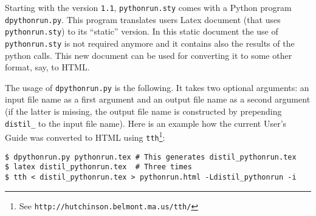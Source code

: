 \documentclass[a4paper,12pt]{article}
\begin{document}
Starting with the version \verb+1.1+, \verb+pythonrun.sty+ comes with
a Python program \verb+dpythonrun.py+. This program translates users
Latex document (that uses \verb+pythonrun.sty+) to its ``static''
version. In this static document the use of \verb+pythonrun.sty+ is not
required anymore and it contains also the results of the python calls. 
This new document can be used for converting it to some other
format, say, to HTML.

The usage of \verb+dpythonrun.py+ is the following. It takes two optional
arguments: an input file name as a first argument and an output file
name as a second argument (if the latter is missing, the output file name
is constructed by prepending \verb+distil_+ to the input file name).
Here is an example how the current User's Guide was converted to HTML
using \verb+tth+\footnote{See
  \texttt{http://hutchinson.belmont.ma.us/tth/}}:
\begin{verbatim}
$ dpythonrun.py pythonrun.tex # This generates distil_pythonrun.tex
$ latex distil_pythonrun.tex  # Three times
$ tth < distil_pythonrun.tex > pythonrun.html -Ldistil_pythonrun -i
\end{verbatim}

\pythonclean
\ifpythondistil\else
\ifshellescape\else
\typeout{***********************************************************}
\typeout{***********************************************************}
\fi\fi
\end{document}
